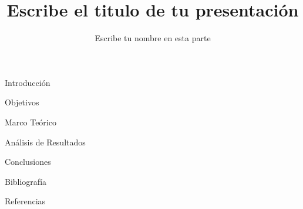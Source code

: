 \documentclass[]{../Configuraciones/presentaciones}
\author{Escribe tu nombre en esta parte}
\title{Escribe el titulo de tu presentación}
\begin{document}
\begin{frame}
\titlepage
\end{frame}

\begin{seccion}{Introducción}

\end{seccion}

\begin{seccion}{Objetivos}

\end{seccion}

\begin{seccion}{Marco Teórico}

\end{seccion}

\begin{seccion}{Análisis de Resultados}

\end{seccion}

\begin{seccion}{Conclusiones}

\end{seccion}

\begin{seccion}{Bibliografía}

\end{seccion}

\begin{seccion}{Referencias}

\end{seccion}
\end{document}
